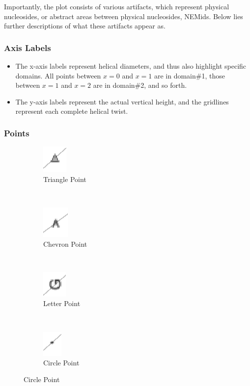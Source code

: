 \documentclass[titlepage]{article}
\begin{document}
Importantly, the plot consists of various artifacts, which represent physical nucleosides, or abstract areas between physical nucleosides, NEMids. Below lies further descriptions of what these artifacts appear as.

\subsubsection{Axis Labels}

\begin{itemize}
	\item The x-axis labels represent helical diameters, and thus also highlight specific domains. All points between $x=0$ and $x=1$ are in domain\#1, those between $x=1$ and $x=2$ are in domain\#2, and so forth.
	\item The y-axis labels represent the actual vertical height, and the gridlines represent each complete helical twist.
\end{itemize}

\subsubsection{Points}

\begin{figure}[h]
	\centering
	\caption{Side View Plot Point Graphics}
	\label{fig:side-view-plot-point-graphics}
	
	\begin{subfigure}{.22\linewidth}
		\centering
		\includegraphics[width=.3in]{up-triangle.png}
		\caption{Triangle Point}
		\label{fig:up-triangle}
	\end{subfigure}%
	~
	\begin{subfigure}{.22\linewidth}
		\centering
		\includegraphics[width=.3in]{up-chevron.png}
		\caption{Chevron Point}
		\label{fig:up-chevron}
	\end{subfigure}%
	~
	\begin{subfigure}{.22\linewidth}
		\centering
		\includegraphics[width=.3in]{base-symbol.png}
		\caption{Letter Point}
		\label{fig:base-symbol}
	\end{subfigure}%
	~
	\begin{subfigure}{.22\linewidth}
		\centering
		\includegraphics[width=.3in]{nondominant-point.png}
		\caption{Circle Point}
		\label{fig:nondominant-point}
	\end{subfigure}
\end{figure}
\end{document}
